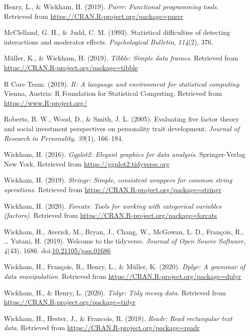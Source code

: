 \documentclass[
  man,floatsintext]{apa6}
\begin{document}
\leavevmode\hypertarget{ref-R-purrr}{}%
Henry, L., \& Wickham, H. (2019). \emph{Purrr: Functional programming tools}. Retrieved from \url{https://CRAN.R-project.org/package=purrr}

\leavevmode\hypertarget{ref-mcclelland1993statistical}{}%
McClelland, G. H., \& Judd, C. M. (1993). Statistical difficulties of detecting interactions and moderator effects. \emph{Psychological Bulletin}, \emph{114}(2), 376.

\leavevmode\hypertarget{ref-R-tibble}{}%
Müller, K., \& Wickham, H. (2019). \emph{Tibble: Simple data frames}. Retrieved from \url{https://CRAN.R-project.org/package=tibble}

\leavevmode\hypertarget{ref-R-base}{}%
R Core Team. (2019). \emph{R: A language and environment for statistical computing}. Vienna, Austria: R Foundation for Statistical Computing. Retrieved from \url{https://www.R-project.org/}

\leavevmode\hypertarget{ref-roberts2005}{}%
Roberts, B. W., Wood, D., \& Smith, J. L. (2005). Evaluating five factor theory and social investment perspectives on personality trait development. \emph{Journal of Research in Personality}, \emph{39}(1), 166--184.

\leavevmode\hypertarget{ref-R-ggplot2}{}%
Wickham, H. (2016). \emph{Ggplot2: Elegant graphics for data analysis}. Springer-Verlag New York. Retrieved from \url{https://ggplot2.tidyverse.org}

\leavevmode\hypertarget{ref-R-stringr}{}%
Wickham, H. (2019). \emph{Stringr: Simple, consistent wrappers for common string operations}. Retrieved from \url{https://CRAN.R-project.org/package=stringr}

\leavevmode\hypertarget{ref-R-forcats}{}%
Wickham, H. (2020). \emph{Forcats: Tools for working with categorical variables (factors)}. Retrieved from \url{https://CRAN.R-project.org/package=forcats}

\leavevmode\hypertarget{ref-R-tidyverse}{}%
Wickham, H., Averick, M., Bryan, J., Chang, W., McGowan, L. D., François, R., \ldots{} Yutani, H. (2019). Welcome to the tidyverse. \emph{Journal of Open Source Software}, \emph{4}(43), 1686. doi:\href{https://doi.org/10.21105/joss.01686}{10.21105/joss.01686}

\leavevmode\hypertarget{ref-R-dplyr}{}%
Wickham, H., François, R., Henry, L., \& Müller, K. (2020). \emph{Dplyr: A grammar of data manipulation}. Retrieved from \url{https://CRAN.R-project.org/package=dplyr}

\leavevmode\hypertarget{ref-R-tidyr}{}%
Wickham, H., \& Henry, L. (2020). \emph{Tidyr: Tidy messy data}. Retrieved from \url{https://CRAN.R-project.org/package=tidyr}

\leavevmode\hypertarget{ref-R-readr}{}%
Wickham, H., Hester, J., \& Francois, R. (2018). \emph{Readr: Read rectangular text data}. Retrieved from \url{https://CRAN.R-project.org/package=readr}

\endgroup
\end{document}
